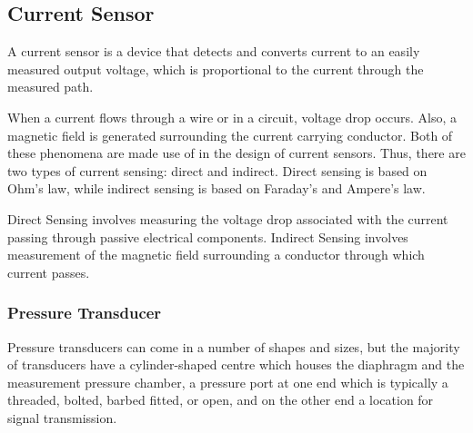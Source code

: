 \subsection{Current Sensor}
A current sensor is a device that detects and converts current to an easily measured output voltage, which is proportional to the current through the measured path.

When a current flows through a wire or in a circuit, voltage drop occurs. Also, a magnetic field is generated surrounding the current carrying conductor. Both of these phenomena are made use of in the design of current sensors. Thus, there are two types of current sensing: direct and indirect. Direct sensing is based on Ohm’s law, while indirect sensing is based on Faraday’s and Ampere’s law.

Direct Sensing involves measuring the voltage drop associated with the current passing through passive electrical components.
Indirect Sensing involves measurement of the magnetic field surrounding a conductor through which current passes.
\subsubsection{Pressure Transducer}
Pressure transducers can come in a number of shapes and sizes, but the majority of transducers have a cylinder-shaped centre which houses the diaphragm and the measurement pressure chamber, a pressure port at one end which is typically a threaded, bolted, barbed fitted, or open, and on the other end a location for signal transmission\cite{noauthor_different_nodate}. 




